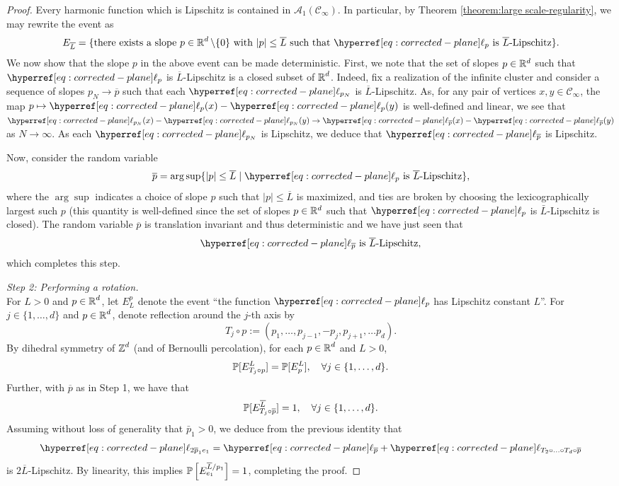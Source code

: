 \documentclass[12pt]{amsart}
\numberwithin{equation}{section}
\begin{document}
\begin{proof}
		Every harmonic function which is Lipschitz is contained in $\mathcal{A}_1(\mathscr{C}_{\infty})$. In particular, by Theorem \ref{theorem:large scale-regularity},
		we may rewrite the event as 
		\[
		E_{\overline{L}} = \{ \mbox{there exists a slope $p \in \R^d \setminus \{ 0 \}$ with $|p| \leq \overline{L}$ such that $\ellp{p}$ is $\overline{L}$-Lipschitz} \}.
		\]	
		We now show that the slope $p$ in the above event can be made deterministic. First, we note that the set of slopes $p \in \Rd$ such that $\ellp{p}$ is $\overline{L}$-Lipschitz is a closed subset of $\R^d$.  
		Indeed, fix a realization of the infinite cluster and consider a sequence of slopes $p_N \to \overline{p}$ such that each $\ellp{p_N}$ is $\overline{L}$-Lipschitz. As, for any pair of vertices $x , y \in \mathscr{C}_\infty$, the map $p \mapsto \ellp{p}(x) - \ellp{p}(y)$ is well-defined and linear, we see that $\ellp{p_N}(x) - \ellp{p_N}(y) \to \ellp{\overline{p}}(x) - \ellp{\overline{p}}(y)$ as $N \to \infty$. 
		As each $\ellp{p_N}$ is Lipschitz, we deduce that $\ellp{\overline{p}}$ is Lipschitz.
		
		Now,  consider the random variable
		\[
		\overline{p} = \arg \sup \{  |p| \leq \overline{L}  \mid \mbox{$\ellp{p}$ is $\overline{L}$-Lipschitz} \},
		\]
		where the $\arg \sup$ indicates a choice of slope $p$ such that $|p| \leq \overline{L}$ is maximized, 
		and ties are broken by choosing the lexicographically largest such $p$ (this quantity is well-defined since the set of slopes $p \in \Rd$ such that $\ellp{p}$ is $\bar L$-Lipschitz is closed).  The random variable $\overline{p}$ is translation invariant and thus deterministic and we have just seen that
		\begin{equation} \label{eq:det-p-lipschitz}
			\ellp{\overline{p}} \mbox{ is $\overline{L}$-Lipschitz},
		\end{equation}
		which completes this step. 
		\medskip 
		
		{\it Step 2: Performing a rotation.} \\ 
		For $L > 0$ and $p \in \R^d$, let $E_L^p$ denote the event  ``the function $\ellp{p}$ has Lipschitz constant $L$''.
		For $j \in \{1, \ldots, d\}$ and $p \in \R^d$, denote reflection around the $j$-th axis by 
		\[
		T_j \circ p := (p_1, \ldots, p_{j-1}, -p_j, p_{j+1}, \ldots p_d).
		\]
		By dihedral symmetry of $\Z^d$ (and of Bernoulli percolation), for each $p \in \R^d$ and $L > 0$, 
		\[
		\P[E_{T_j \circ p}^L] = \P[E_p^L], \quad \forall j \in \{1, \ldots, d\}.
		\]
		Further, with $\overline p$ as in Step 1, we have that 
		\[
		\P[E_{T_j \circ \overline p}^{\overline{L}}] = 1, \quad \forall j \in \{1, \ldots, d\}.
		\]
		Assuming without loss of generality that $\bar p_1 >0 $, we deduce from the previous identity that 
		\[
		\ellp{2\overline{p}_1 e_1} = \ellp{\overline{p}} + \ellp{T_2 \circ \ldots \circ T_d \circ \overline{p}}
		\]
		is $2 \overline{L}$-Lipschitz. By linearity, this implies $\P\left[E_{e_1}^{ \overline{L}/p_1}\right] = 1$, completing the proof.
	\end{proof}
	
\end{document}
